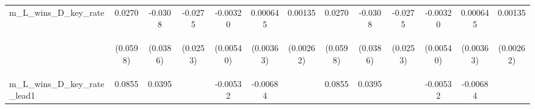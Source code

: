 \documentclass[]{article}
\begin{document}
\begin{center}
\begin{tabular}{lcccccccccccc}
m\_L\_wins\_D\_key\_rate & 0.0270 & -0.0308 & -0.0275 & -0.00320 & 0.000645 & 0.00135 & 0.0270 & -0.0308 & -0.0275 & -0.00320 & 0.000645 & 0.00135 \\
\vspace{4pt} & \begin{footnotesize}(0.0598)\end{footnotesize} & \begin{footnotesize}(0.0386)\end{footnotesize} & \begin{footnotesize}(0.0253)\end{footnotesize} & \begin{footnotesize}(0.00540)\end{footnotesize} & \begin{footnotesize}(0.00363)\end{footnotesize} & \begin{footnotesize}(0.00262)\end{footnotesize} & \begin{footnotesize}(0.0598)\end{footnotesize} & \begin{footnotesize}(0.0386)\end{footnotesize} & \begin{footnotesize}(0.0253)\end{footnotesize} & \begin{footnotesize}(0.00540)\end{footnotesize} & \begin{footnotesize}(0.00363)\end{footnotesize} & \begin{footnotesize}(0.00262)\end{footnotesize} \\
m\_L\_wins\_D\_key\_rate\_lead1 & 0.0855 & 0.0395 &  & -0.00532 & -0.00684 &  & 0.0855 & 0.0395 &  & -0.00532 & -0.00684 &  \\

\end{tabular}
\end{center}
\end{document}
